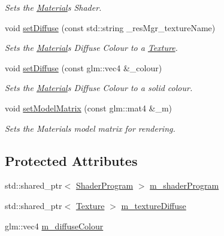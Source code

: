 \begin{DoxyCompactItemize}
\begin{DoxyCompactList}\small\item\em Sets the \hyperlink{class_cookie_eng_1_1_resources_1_1_material}{Material}\textquotesingle{}s Shader. \end{DoxyCompactList}\item 
void \hyperlink{class_cookie_eng_1_1_resources_1_1_material_a833ddee7037c0cef8c8c389e64f3d76b}{set\+Diffuse} (const std\+::string \+\_\+res\+Mgr\+\_\+texture\+Name)
\begin{DoxyCompactList}\small\item\em Sets the \hyperlink{class_cookie_eng_1_1_resources_1_1_material}{Material}\textquotesingle{}s Diffuse Colour to a \hyperlink{class_cookie_eng_1_1_resources_1_1_texture}{Texture}. \end{DoxyCompactList}\item 
void \hyperlink{class_cookie_eng_1_1_resources_1_1_material_abd2e0f6b5a0ea9987cc545859d8cc14e}{set\+Diffuse} (const glm\+::vec4 \&\+\_\+colour)
\begin{DoxyCompactList}\small\item\em Sets the \hyperlink{class_cookie_eng_1_1_resources_1_1_material}{Material}\textquotesingle{}s Diffuse Colour to a solid colour. \end{DoxyCompactList}\item 
void \hyperlink{class_cookie_eng_1_1_resources_1_1_material_ab0155fcca9b954c1661b02e01ab9e06d}{set\+Model\+Matrix} (const glm\+::mat4 \&\+\_\+m)
\begin{DoxyCompactList}\small\item\em Sets the Materials model matrix for rendering. \end{DoxyCompactList}\end{DoxyCompactItemize}
\subsection*{Protected Attributes}
\begin{DoxyCompactItemize}
\item 
std\+::shared\+\_\+ptr$<$ \hyperlink{class_cookie_eng_1_1_resources_1_1_shader_program}{Shader\+Program} $>$ \hyperlink{class_cookie_eng_1_1_resources_1_1_material_acb45c40912ababa7776c666af13b1f3f}{m\+\_\+shader\+Program}
\item 
std\+::shared\+\_\+ptr$<$ \hyperlink{class_cookie_eng_1_1_resources_1_1_texture}{Texture} $>$ \hyperlink{class_cookie_eng_1_1_resources_1_1_material_adf7fcbb59dcfbad47d48052522414791}{m\+\_\+texture\+Diffuse}
\item 
glm\+::vec4 \hyperlink{class_cookie_eng_1_1_resources_1_1_material_abbf6212e6e8c5e341f20628cd2c3aea2}{m\+\_\+diffuse\+Colour}
\end{DoxyCompactItemize}


